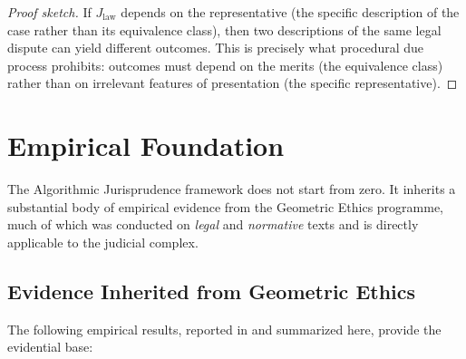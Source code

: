 \documentclass[12pt]{article}
\theoremstyle{definition}
\theoremstyle{remark}
\begin{document}
\begin{proof}[Proof sketch]
If $J_{\text{law}}$ depends on the representative (the specific description of the case rather than its equivalence class), then two descriptions of the same legal dispute can yield different outcomes.  This is precisely what procedural due process prohibits: outcomes must depend on the merits (the equivalence class) rather than on irrelevant features of presentation (the specific representative).
\end{proof}


\section{Empirical Foundation}
\label{sec:empirical}

The Algorithmic Jurisprudence framework does not start from zero.  It inherits a substantial body of empirical evidence from the Geometric Ethics programme, much of which was conducted on \emph{legal} and \emph{normative} texts and is directly applicable to the judicial complex.

\subsection{Evidence Inherited from Geometric Ethics}

The following empirical results, reported in \cite{anon2026a} and summarized here, provide the evidential base:
\end{document}
